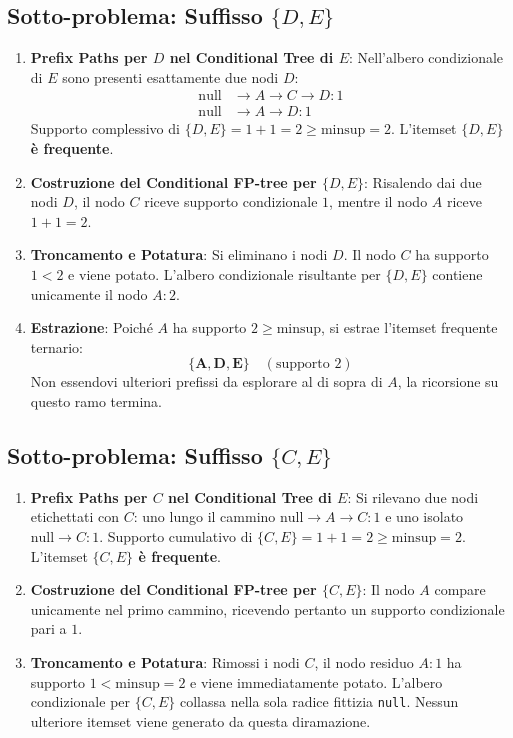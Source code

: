 \FloatBarrier
\subsection{Sotto-problema: Suffisso $\{D, E\}$}
\begin{enumerate}
    \item \textbf{Prefix Paths per $D$ nel Conditional Tree di $E$}:
    Nell'albero condizionale di $E$ sono presenti esattamente due nodi $D$:
    \begin{align}
    \text{null} &\to A \to C \to D:1 \\
    \text{null} &\to A \to D:1
    \end{align}
    Supporto complessivo di $\{D, E\} = 1 + 1 = 2 \ge \text{minsup} = 2$. L'itemset \textbf{$\{D, E\}$ è frequente}.
    \item \textbf{Costruzione del Conditional FP-tree per $\{D, E\}$}:
    Risalendo dai due nodi $D$, il nodo $C$ riceve supporto condizionale $1$, mentre il nodo $A$ riceve $1 + 1 = 2$.
    \item \textbf{Troncamento e Potatura}:
    Si eliminano i nodi $D$. Il nodo $C$ ha supporto $1 < 2$ e viene potato.
    L'albero condizionale risultante per $\{D, E\}$ contiene unicamente il nodo $A:2$.
    \item \textbf{Estrazione}: Poiché $A$ ha supporto $2 \ge \text{minsup}$, si estrae l'itemset frequente ternario:
    \begin{equation}
    \mathbf{\{A, D, E\}} \quad (\text{supporto } 2)
    \end{equation}
    Non essendovi ulteriori prefissi da esplorare al di sopra di $A$, la ricorsione su questo ramo termina.
\end{enumerate}

\FloatBarrier
\subsection{Sotto-problema: Suffisso $\{C, E\}$}
\begin{enumerate}
    \item \textbf{Prefix Paths per $C$ nel Conditional Tree di $E$}:
    Si rilevano due nodi etichettati con $C$: uno lungo il cammino $\text{null} \to A \to C:1$ e uno isolato $\text{null} \to C:1$.
    Supporto cumulativo di $\{C, E\} = 1 + 1 = 2 \ge \text{minsup} = 2$. L'itemset \textbf{$\{C, E\}$ è frequente}.
    \item \textbf{Costruzione del Conditional FP-tree per $\{C, E\}$}:
    Il nodo $A$ compare unicamente nel primo cammino, ricevendo pertanto un supporto condizionale pari a $1$.
    \item \textbf{Troncamento e Potatura}:
    Rimossi i nodi $C$, il nodo residuo $A:1$ ha supporto $1 < \text{minsup} = 2$ e viene immediatamente potato.
    L'albero condizionale per $\{C, E\}$ collassa nella sola radice fittizia \texttt{null}. Nessun ulteriore itemset viene generato da questa diramazione.
\end{enumerate}

